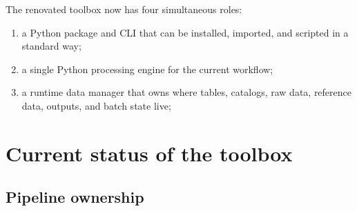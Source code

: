 \documentclass[11pt,a4paper]{article}
\begin{document}
The renovated toolbox now has four simultaneous roles:

\begin{enumerate}[leftmargin=1.6em]
  \item a Python package and CLI that can be installed, imported, and scripted in a standard way;
  \item a single Python processing engine for the current workflow;
  \item a runtime data manager that owns where tables, catalogs, raw data, reference data, outputs, and batch state live;
\end{enumerate}

\section{Current status of the toolbox}

\subsection{Pipeline ownership}
\end{document}
